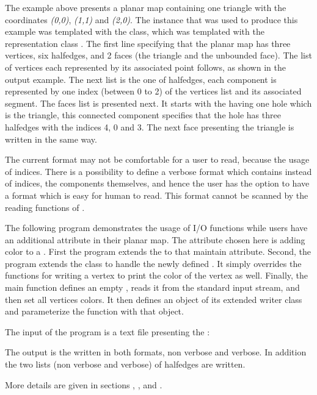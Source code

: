 \begin{ccAdvanced}
The example above presents a planar map containing one triangle with the coordinates 
{\em (0,0)}, {\em (1,1)} and {\em (2,0)}. 
The  instance that was used to produce this example was templated 
with the  class, which was templated with the representation 
class .
The first line specifying that the planar map has three vertices, six halfedges, 
and 2 faces (the triangle and the unbounded face). 
The list of vertices each represented by its associated point follows, as shown in the 
output example. 
The next list is the one of halfedges, each component is represented by one 
index (between 0 to 2) of the vertices 
list and its associated segment. 
The faces list is presented next. It starts with the  
having one hole which is the triangle, this connected component specifies that the hole has three halfedges with 
the indices 4, 0 and 3. The next face presenting the triangle is written in the same way.

The current format may not be comfortable for a user to read, because the usage of indices. 
There is a possibility to define a verbose format which contains instead of 
indices, the components themselves, and hence the user has the option to have a format which is easy for human to read.
This format cannot be scanned by the reading functions of .

\label{PM_sec:example10}

The following program demonstrates the usage of I/O functions while users have 
an additional attribute in their planar map.
The attribute chosen here is adding color to a .
First the program extends the  to that maintain attribute.
Second, the program extends the  class to handle the newly 
defined . 
It simply overrides the functions for writing a vertex to print the color of the vertex as well. 
Finally, the main function defines an empty ,  
reads it from the standard input stream, and then set all vertices colors. It then defines an object of its extended writer class and 
parameterize the function  with that object.


The input of the program is a text file presenting the :

The output is the  written in both formats, non verbose and verbose. In addition the two lists 
(non verbose and verbose) of halfedges are written.

More details are given in sections
,
, 
 and
.

\end{ccAdvanced}

